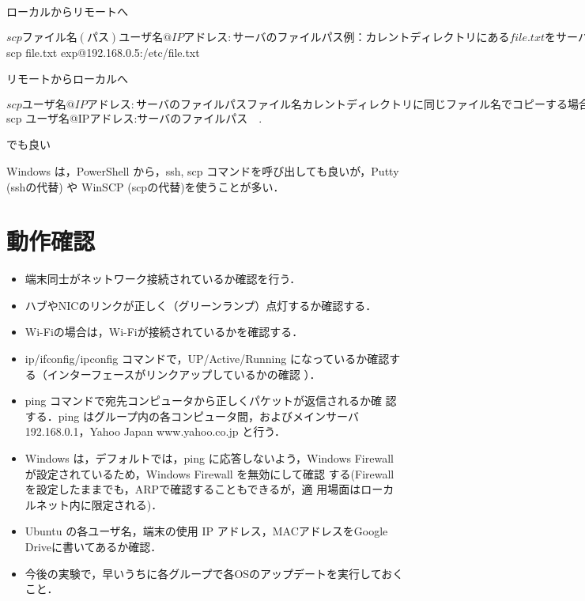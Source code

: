 \begin{cli}
ローカルからリモートへ

$ scp ファイル名(パス)  ユーザ名@IPアドレス:サーバのファイルパス

例：カレントディレクトリにある file.txt をサーバの/etc/file.txt にコピーする

$ scp file.txt  exp@192.168.0.5:/etc/file.txt

リモートからローカルへ

$ scp ユーザ名@IPアドレス:サーバのファイルパス　　ファイル名

カレントディレクトリに同じファイル名でコピーする場合は，

$ scp ユーザ名@IPアドレス:サーバのファイルパス　.

でも良い

\end{cli}

Windows は，PowerShell から，ssh, scp コマンドを呼び出しても良いが，Putty (sshの代替) や WinSCP (scpの代替)を使うことが多い．

\section{動作確認}
\begin{itemize}
 \item %
 端末同士がネットワーク接続されているか確認を行う．
 \item ハブやNICのリンクが正しく（グリーンランプ）点灯するか確認する．
 \item Wi-Fiの場合は，Wi-Fiが接続されているかを確認する．
 \item ip/ifconfig/ipconfig コマンドで，UP/Active/Running になっているか確認する（インターフェースがリンクアップしているかの確認
 ）．
 \item ping コマンドで宛先コンピュータから正しくパケットが返信されるか確
       認する．ping はグループ内の各コンピュータ間，およびメインサーバ
       192.168.0.1，Yahoo Japan www.yahoo.co.jp と行う．
 \item Windows は，デフォルトでは，ping に応答しないよう，Windows
       Firewall が設定されているため，Windows Firewall を無効にして確認
       する(Firewall を設定したままでも，ARPで確認することもできるが，適
       用場面はローカルネット内に限定される)．
　\item Ubuntu の各ユーザ名，端末の使用 IP アドレス，MACアドレスをGoogle Driveに書いてあるか確認．
　\item 今後の実験で，早いうちに各グループで各OSのアップデートを実行しておくこと．
\end{itemize}

